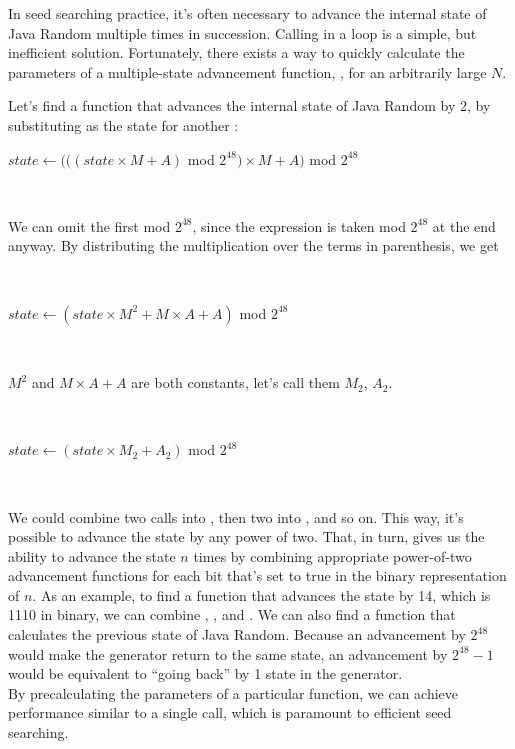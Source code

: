 \documentclass{article}
\begin{document}
In seed searching practice, it’s often necessary to advance the internal state of Java Random multiple times in succession. Calling  in a loop is a simple, but inefficient solution. Fortunately, there exists a way to quickly calculate the parameters of a multiple-state advancement function, , for an arbitrarily large $N$.

Let’s find a function that advances the internal state of Java Random by 2, by substituting  as the state for another :

\begin{algorithmic}
    \State $state \gets (((state \times M + A)$ mod $2^{48}) \times M + A)$ mod $2^{48}$
\EndFunction
\end{algorithmic}
\ \

\noindent We can omit the first mod $2^{48}$, since the expression is taken mod $2^{48}$ at the end anyway. By distributing the multiplication over the terms in parenthesis, we get

\
\begin{algorithmic}
    \State $state \gets (state \times M^2 + M \times A + A)$ mod $2^{48}$
\EndFunction
\end{algorithmic}
\ \

\noindent $M^2$ and $M \times A + A$ are both constants, let’s call them $M_2$, $A_2$.

\
\begin{algorithmic}
\Function{advanceBy2}{} 
    \State $state \gets (state \times M_2 + A_2)$ mod $2^{48}$
\EndFunction
\end{algorithmic}
\ \

We could combine two  calls into , then two  into , and so on. This way, it’s possible to advance the state by any power of two. That, in turn, gives us the ability to advance the state $n$ times by combining appropriate power-of-two advancement functions for each bit that’s set to true in the binary representation of $n$.
As an example, to find a function that advances the state by 14, which is 1110 in binary, we can combine , , and . 
We can also find a function that calculates the previous state of Java Random. Because an advancement by $2^{48}$ would make the generator return to the same state, an advancement by $2^{48}-1$ would be equivalent to “going back” by 1 state in the generator. \\
By precalculating the parameters of a particular \Call{advanceByN}{} function, we can achieve performance similar to a single \Call{nextSeed}{} call, which is paramount to efficient seed searching.
\end{document}
